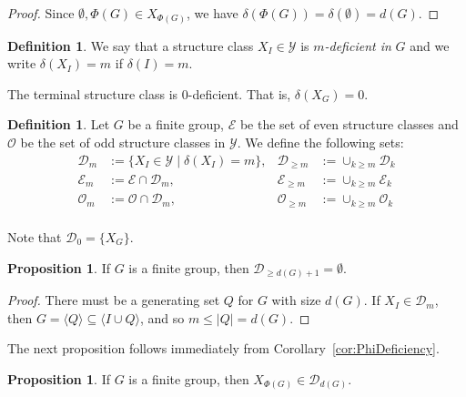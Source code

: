 \documentclass[12pt]{amsart}
\theoremstyle{definition}
\newtheorem{proposition}[equation]{Proposition}
\theoremstyle{definition}
\newtheorem{definition}[equation]{Definition}
\numberwithin{equation}{section}
\begin{document}
\begin{proof}
Since $\emptyset,\Phi(G)\in X_{\Phi(G)}$, we have ${\delta}(\Phi(G))={\delta}(\emptyset)=d(G)$.
\end{proof}

\begin{definition}
We say that a structure class $X_I\in\mathcal{Y}$ is {\it $m$-deficient in} $G$ and we write ${\delta}(X_I)=m$ if ${\delta}(I)=m$. 
\end{definition}

The terminal structure class is $0$-deficient. That is, ${\delta}(X_G)=0$.

\begin{definition}
Let $G$ be a finite group, $\mathcal{E}$ be the set of even structure classes and $\mathcal{O}$ be the set of odd structure classes in $\mathcal{Y}$.
We define the following sets:
\[
\begin{aligned}
\mathcal{D}_m &:= \{ X_I\in \mathcal{Y} \mid {\delta}(X_I)=m \}, & \mathcal{D}_{\geq m} &:= \cup_{k \geq m} \mathcal{D}_k \\ 
\mathcal{E}_m &:= \mathcal{E}\cap \mathcal{D}_m, & \mathcal{E}_{\geq m} &:= \cup_{k \geq m} \mathcal{E}_k \\ 
\mathcal{O}_m &:= \mathcal{O}\cap \mathcal{D}_m,  & \mathcal{O}_{\geq m} & := \cup_{k \geq m} \mathcal{O}_k \\
\end{aligned}
\]
\end{definition}

Note that $\mathcal{D}_0=\{X_G\}$.

\begin{proposition}\label{prop:GENemptysets}
If $G$ is a finite group, then $\mathcal{D}_{\geq d(G)+1}=\emptyset$.
\end{proposition}
\begin{proof}
There must be a generating set $Q$ for $G$ with size $d(G)$. If $X_I \in \mathcal{D}_m$, then $G=\langle Q \rangle \subseteq \langle I\cup Q \rangle$, and so $m \leq |Q| = d(G)$.   
\end{proof}

The next proposition follows immediately from Corollary~\ref{cor:PhiDeficiency}.

\begin{proposition}\label{prop:frattinilocation}
If $G$ is a finite group, then $X_{\Phi(G)} \in \mathcal{D}_{d(G)}$.
\end{proposition}
\end{document}
